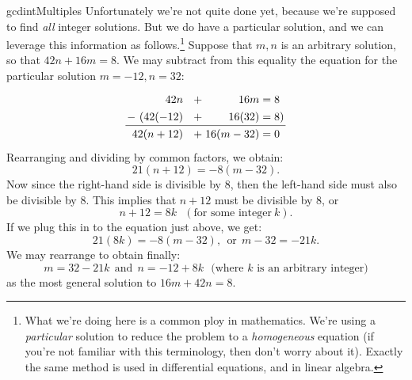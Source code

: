 \begin{example}{gcdintMultiples}
Unfortunately we're not quite done yet, because we're supposed to find \emph{all} integer solutions. But we do have a particular solution, and we can leverage this information as follows.\footnote{What we're doing here  is a common ploy in mathematics.  We're using a \emph{particular} solution to reduce the problem to a \emph{homogeneous} equation (if you're not familiar with this terminology, then don't worry about it).  Exactly the same method is used in differential equations, and in linear algebra.}
   Suppose that $m,n$ is an arbitrary solution, so that  $42n + 16m = 8$.  We may subtract from this  equality the equation for the particular solution $m=-12, n=32$: 
\[\arraycolsep=1.4pt\def\arraystretch{1.3}
\begin{array}{rcrcl } 
    42n &~~+& 16m  &=& 8  \\
 -~ (42(-12) &~~+& 16(32)  &=&  8)   \\
    \cline{1-5} 
    42(n+12) &~~+& 16(m-32) &=& 0   
\end{array}
\]
Rearranging and dividing by common factors, we obtain:
\[ 21(n+12) = -8(m-32).\]
Now since the right-hand side is divisible by 8, then the left-hand side must also be divisible by 8.  This implies that $n+12$ must be divisible by 8, or 
\[ n+12 = 8k~~~(\text{for some integer}~k). \]
If we plug this in to the equation just above, we get:
\[ 21(8k) = -8(m-32),~~\text{or}~~m-32 = -21k .\]
We may rearrange to obtain finally:
\[ m = 32 - 21k ~~\text{and}~~ n = -12 + 8k~~~(\text{where }k \text{  is an arbitrary integer)} \]
as the most general solution to  $16m + 42n = 8$.
\end {example}

